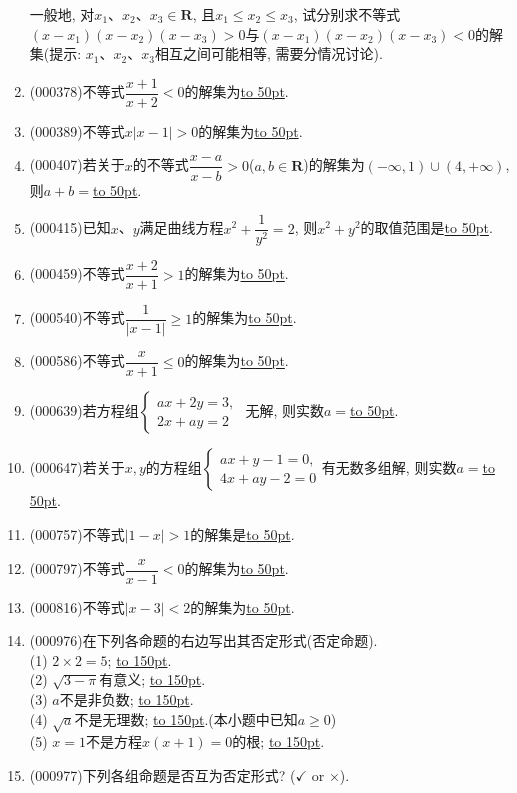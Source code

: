 \documentclass[10pt,a4paper]{article}
\newcommand{\blank}[1]{\underline{\hbox to #1pt{}}}
\begin{document}
\begin{enumerate}[1.]
一般地, 对$x_1$、$x_2$、$x_3\in \mathbf{R}$, 且$x_1\le x_2\le x_3$, 试分别求不等式$(x-x_1)(x-x_2)(x-x_3)>0$与$(x-x_1)(x-x_2)(x-x_3)<0$的解集(提示: $x_1$、$x_2$、$x_3$相互之间可能相等, 需要分情况讨论).
\item {\tiny (000378)}不等式$\dfrac{x+1}{x+2}<0$的解集为\blank{50}.
\item {\tiny (000389)}不等式$x|x-1|>0$的解集为\blank{50}.
\item {\tiny (000407)}若关于$x$的不等式$\dfrac{x-a}{x-b}>0$($a,b\in \mathbf{R}$)的解集为$(-\infty ,1)\cup (4,+\infty)$, 则$a+b=$\blank{50}.
\item {\tiny (000415)}已知$x$、$y$满足曲线方程$x^2+\dfrac1{y^2}=2$, 则$x^2+y^2$的取值范围是\blank{50}.
\item {\tiny (000459)}不等式$\dfrac{x+2}{x+1}>1$的解集为\blank{50}.
\item {\tiny (000540)}不等式$\dfrac1{|x-1|}\ge 1 $的解集为\blank{50}.
\item {\tiny (000586)}不等式$\dfrac x{x+1}\le 0$的解集为\blank{50}.
\item {\tiny (000639)}若方程组$\begin{cases} ax+2y=3, \\ 2x+ay=2 \end{cases}$ 无解, 则实数$a=$\blank{50}.
\item {\tiny (000647)}若关于$x,y$的方程组$\begin{cases} ax+y-1=0,  \\ 4x+ay-2=0  \end{cases}$有无数多组解, 则实数$a=$\blank{50}.
\item {\tiny (000757)}不等式$|1-x|>1$的解集是\blank{50}.
\item {\tiny (000797)}不等式$\dfrac x{x-1}<0$的解集为\blank{50}.
\item {\tiny (000816)}不等式$|x-3|<2$的解集为\blank{50}.
\item {\tiny (000976)}在下列各命题的右边写出其否定形式(否定命题).\\ 
(1) $2 \times 2 =5$; \blank{150}.\\ 
(2) $\sqrt{3-\pi}$有意义; \blank{150}.\\ 
(3) $a$不是非负数; \blank{150}.\\ 
(4) $\sqrt{a}$不是无理数; \blank{150}.(本小题中已知$a\ge 0$)\\ 
(5) $x=1$不是方程$x(x+1)=0$的根; \blank{150}.
\item {\tiny (000977)}下列各组命题是否互为否定形式? ($\checkmark$ or $\times$).\\ 

\end{enumerate}
\end{document}
